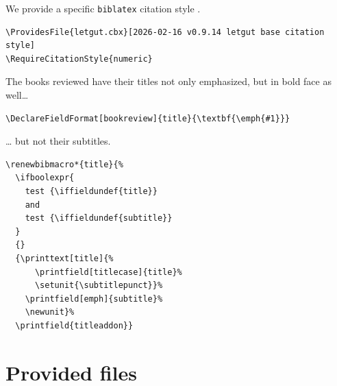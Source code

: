 \documentclass{letgut}
\begin{document}
We provide a specific \lstinline+biblatex+ citation style .

\begin{lstlisting}
\ProvidesFile{letgut.cbx}[2026-02-16 v0.9.14 letgut base citation style]
\RequireCitationStyle{numeric}
\end{lstlisting}

The books reviewed have their titles not only emphasized, but in bold face as
well\ldots{}

\begin{lstlisting}
\DeclareFieldFormat[bookreview]{title}{\textbf{\emph{#1}}}
\end{lstlisting}

\ldots{} but not their subtitles.

\begin{lstlisting}
\renewbibmacro*{title}{%
  \ifboolexpr{
    test {\iffieldundef{title}}
    and
    test {\iffieldundef{subtitle}}
  }
  {}
  {\printtext[title]{%
      \printfield[titlecase]{title}%
      \setunit{\subtitlepunct}}%
    \printfield[emph]{subtitle}%
    \newunit}%
  \printfield{titleaddon}}
\end{lstlisting}
\section{Provided files}
\label{Providedfiles-g09h55h0jlj0}
\end{document}
